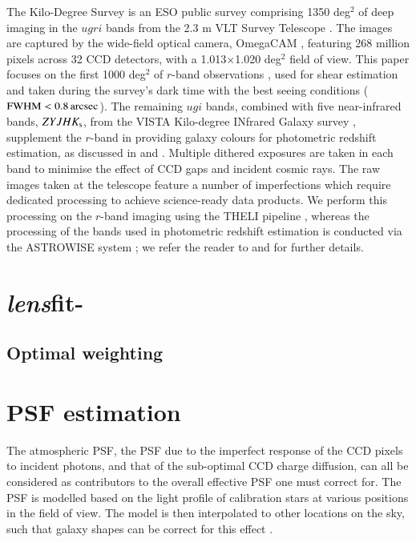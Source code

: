 \documentclass{aa}
\begin{document}
The Kilo-Degree Survey is an ESO public survey comprising 1350 deg$^2$ of deep imaging in the $ugri$ bands from the 2.3 m VLT Survey Telescope \cite[VST]{Capaccioli_Schipani_2011, Capaccioli_etal_2012}. The images are captured by the wide-field optical camera, OmegaCAM \citep{Kuijken_2011}, featuring 268 million pixels across 32 CCD detectors, with a 1.013$\times$1.020 deg$^2$ field of view. This paper focuses on the first 1000 deg$^2$ of $r$-band observations \citep[K1000]{Kuijken_etal_2019}, used for shear estimation and taken during the survey's dark time with the best seeing conditions ($\rm{FWHM} < 0.8 \, \rm{arcsec}$). The remaining $ugi$ bands, combined with five near-infrared bands, $ZYJHK_{\rm s}$, from the VISTA Kilo-degree INfrared Galaxy survey \citep[VIKING]{Edge_etal_2013}, supplement the $r$-band in providing galaxy colours for photometric redshift estimation, as discussed in \cite{Hildebrandt_etal_2018} and \cite{Kuijken_etal_2019}. Multiple dithered exposures are taken in each band to minimise the effect of CCD gaps and incident cosmic rays. The raw images taken at the telescope feature a number of imperfections which require dedicated processing to achieve science-ready data products. We perform this processing on the $r$-band imaging using the THELI pipeline \citep{Erben_etal_2005, Schirmer_etal_2013}, whereas the processing of the bands used in photometric redshift estimation is conducted via the ASTROWISE system \citep{Begeman_etal_2013}; we refer the reader to \cite{Hildebrandt_etal_2016} and \cite{Kuijken_etal_2019} for further details.  
	




\section{\textit{lens}fit-{} }

    \subsection{Optimal weighting}

\section{PSF estimation} \label{sec:PSF_Estimation}

	The atmospheric PSF, the PSF due to the imperfect response of the CCD pixels to incident photons, and that of the sub-optimal CCD charge diffusion, can all be considered as contributors to the overall effective PSF one must correct for. The PSF is modelled based on the light profile of calibration stars at various positions in the field of view. The model is then interpolated to other locations on the sky, such that galaxy shapes can be correct for this effect \citep[see, for example,][]{Berge_etal_2012, Gentile_etal_2013, Kitching_etal_2013, Lu_etal_2017}.
	
\end{document}
